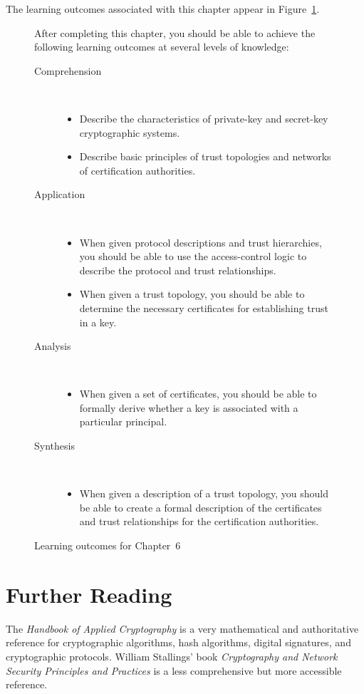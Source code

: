 The learning outcomes associated with this chapter appear in
Figure~\ref{fig:outcomes-chap6}.

\begin{figure}[tb]
  \centering
After completing this chapter, you should be able to achieve the following
learning outcomes at several levels of knowledge:
\begin{description}
\item[Comprehension] \
  \begin{itemize}
  \item Describe the characteristics of private-key and secret-key
    cryptographic systems.
  \item Describe basic principles of trust topologies and networks of
    certification authorities.
  \end{itemize}
\item[Application] \
  \begin{itemize}
  \item When given protocol descriptions and trust hierarchies, you
    should be able to use the access-control logic to describe the
    protocol and trust relationships.
  \item When given a trust topology, you should be able to determine the
    necessary certificates for establishing trust in a key.
  \end{itemize}
\item[Analysis] \
  \begin{itemize}
  \item When given a set of certificates, you should be able to formally
    derive whether a key is associated with a particular principal.
  \end{itemize}
\item[Synthesis] \
  \begin{itemize}
  \item When given a description of a trust topology, you should be able
    to create a formal description of the certificates and trust
    relationships for the certification authorities.
  \end{itemize}
\end{description}
  
  \caption{Learning outcomes for Chapter~6}
  \label{fig:outcomes-chap6}
\end{figure}

\section{Further Reading}
The \emph{Handbook of Applied Cryptography} \cite{Handbook} is a very
mathematical and authoritative reference for cryptographic algorithms,
hash algorithms, digital signatures, and cryptographic protocols.
William Stallings' book \emph{Cryptography and Network Security
  Principles and Practices} \cite{Stallings} is a less comprehensive but
more accessible reference.

